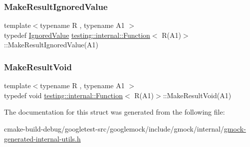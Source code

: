 \subsubsection{\texorpdfstring{MakeResultIgnoredValue}{MakeResultIgnoredValue}}
{\footnotesize\ttfamily template$<$typename R , typename A1 $>$ \\
typedef \mbox{\hyperlink{classtesting_1_1internal_1_1IgnoredValue}{Ignored\+Value}} \mbox{\hyperlink{structtesting_1_1internal_1_1Function}{testing\+::internal\+::\+Function}}$<$ R(A1)$>$\+::Make\+Result\+Ignored\+Value(A1)}

\mbox{\label{structtesting_1_1internal_1_1Function_3_01R_07A1_08_4_aab10495172953eb51fc3940c4c1e890a}} 
\subsubsection{\texorpdfstring{MakeResultVoid}{MakeResultVoid}}
{\footnotesize\ttfamily template$<$typename R , typename A1 $>$ \\
typedef void \mbox{\hyperlink{structtesting_1_1internal_1_1Function}{testing\+::internal\+::\+Function}}$<$ R(A1)$>$\+::Make\+Result\+Void(A1)}



The documentation for this struct was generated from the following file\+:\begin{DoxyCompactItemize}
\item 
cmake-\/build-\/debug/googletest-\/src/googlemock/include/gmock/internal/\mbox{\hyperlink{gmock-generated-internal-utils_8h}{gmock-\/generated-\/internal-\/utils.\+h}}\end{DoxyCompactItemize}
